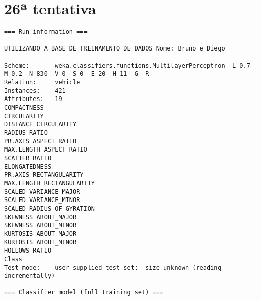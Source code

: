 \documentclass[
	article,			%
	11pt,				%
	oneside,			%
	a4paper,			%
	english,			%
	brazil,				%
	sumario=tradicional
	]{abntex2}
\begin{document}
\section{26ª tentativa}

\begin{lstlisting}
=== Run information ===

UTILIZANDO A BASE DE TREINAMENTO DE DADOS Nome: Bruno e Diego

Scheme:       weka.classifiers.functions.MultilayerPerceptron -L 0.7 -M 0.2 -N 830 -V 0 -S 0 -E 20 -H 11 -G -R
Relation:     vehicle
Instances:    421
Attributes:   19
COMPACTNESS
CIRCULARITY
DISTANCE CIRCULARITY
RADIUS RATIO
PR.AXIS ASPECT RATIO
MAX.LENGTH ASPECT RATIO
SCATTER RATIO
ELONGATEDNESS
PR.AXIS RECTANGULARITY
MAX.LENGTH RECTANGULARITY
SCALED VARIANCE_MAJOR
SCALED VARIANCE_MINOR
SCALED RADIUS OF GYRATION
SKEWNESS ABOUT_MAJOR
SKEWNESS ABOUT_MINOR
KURTOSIS ABOUT_MAJOR
KURTOSIS ABOUT_MINOR
HOLLOWS RATIO
Class
Test mode:    user supplied test set:  size unknown (reading incrementally)

=== Classifier model (full training set) ===


\end{lstlisting}
\end{document}
